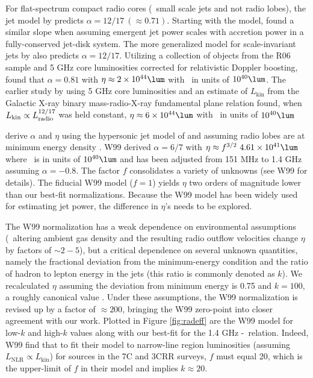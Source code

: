 \documentclass{emulateapj}
\begin{document}
For flat-spectrum compact radio cores (\eg\ small scale jets and not
radio lobes), the jet model by \citet{1979ApJ...232...34B} predicts
$\alpha = 12/17~(\approx 0.71)$. Starting with the
\citet{1979ApJ...232...34B} model, \citet{1995A&A...293..665F} found a
similar slope when assuming emergent jet power scales with accretion
power in a fully-conserved jet-disk system. The more generalized model
for scale-invariant jets by \citet{2003MNRAS.343L..59H} also predicts
$\alpha = 12/17$. Utilizing a collection of objects from the R06
sample and 5 GHz core luminosities corrected for relativistic Doppler
boosting, \citet{2007MNRAS.381..589M} found that $\alpha = 0.81$ with
$\eta \approx 2\times10^{44} \lum$ with \prad\ in units of $10^{40}
\lum$. The earlier study by \citet{2005ApJ...633..384H} using 5 GHz
core luminosities and an estimate of $L_{\mathrm{kin}}$ from the
Galactic X-ray binary mass-radio-X-ray fundamental plane relation
\citep{2003MNRAS.344...60G, 2003MNRAS.345.1057M} found, when
$L_{\mathrm{kin}} \propto L_{\mathrm{radio}}^{12/17}$ was held constant, $\eta
\approx 6\times10^{44} \lum$ with \prad\ in units of $10^{40} \lum$

\citet[][hereafter W99]{1999MNRAS.309.1017W} derive $\alpha$ and
$\eta$ using the hypersonic jet model of \citet{1991MNRAS.250..581F}
and assuming radio lobes are at minimum energy density \citep[see][for
  details]{1980ARA&A..18..165M}. W99 derived $\alpha = 6/7$ with $\eta
\approx f^{3/2}~4.61\times10^{41} \lum$ where \prad\ is in units of
$10^{40} \lum$ and has been adjusted from 151 MHz to 1.4 GHz assuming
$\alpha = -0.8$. The factor $f$ consolidates a variety of unknowns
(see W99 for details). The fiducial W99 model ($f=1$) yields $\eta$
two orders of magnitude lower than our best-fit
normalizations. Because the W99 model has been widely used for
estimating jet power, the difference in $\eta$'s needs to be explored.

The W99 normalization has a weak dependence on environmental
assumptions (\ie\ altering ambient gas density and the resulting radio
outflow velocities change $\eta$ by factors of $\sim 2-5$), but a
critical dependence on several unknown quantities, namely the
fractional deviation from the minimum-energy condition and the ratio
of hadron to lepton energy in the jets (this ratio is commonly denoted
as $k$). We recalculated $\eta$ assuming the deviation from minimum
energy is 0.75 and $k = 100$, a roughly canonical value
\citep{2005MNRAS.364.1343D, 2006MNRAS.372.1741D, 2006ApJ...648..200D,
  birzan08}. Under these assumptions, the W99 normalization is revised
up by a factor of $\approx 200$, bringing the W99 zero-point into
closer agreement with our work. Plotted in Figure \ref{fig:radeff} are
the W99 model for low-$k$ and high-$k$ values along with our best-fit
for the 1.4 GHz \pjet-\prad\ relation. Indeed, W99 find that to fit
their model to narrow-line region luminosities (assuming
$L_{\mathrm{NLR}} \propto L_{\mathrm{kin}}$) for sources in the 7C and
3CRR surveys, $f$ must equal 20, which is the upper-limit of $f$ in
their model and implies $k \approx 20$.
\end{document}
